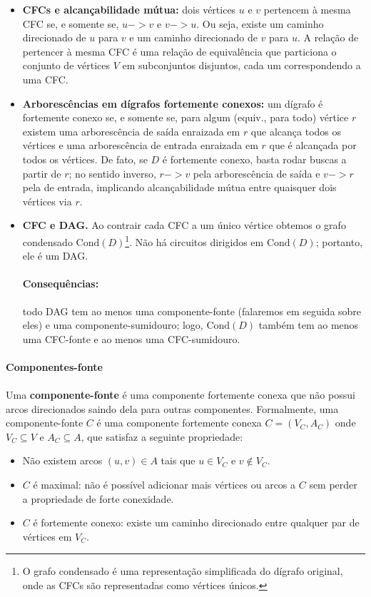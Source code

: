 \documentclass[12pt,a4paper]{article}
\def\emph#1{#1}%
\def\leadsto{->}%
\begin{document}
\begin{itemize}
    \item \textbf{CFCs e alcançabilidade mútua:} dois vértices \(u\) e \(v\) pertencem à mesma CFC se, e somente se, \(u\leadsto v\) e \(v\leadsto u\). Ou seja, existe um caminho direcionado de \(u\) para \(v\) e um caminho direcionado de \(v\) para \(u\). A relação de pertencer à mesma CFC é uma relação de equivalência que particiona o conjunto de vértices \(V\) em subconjuntos disjuntos, cada um correspondendo a uma CFC.
    \item \textbf{Arborescências em dígrafos fortemente conexos:} um dígrafo é fortemente conexo se, e somente se, para algum (equiv., para todo) vértice $r$ existem uma \emph{arborescência de saída} enraizada em $r$ que alcança todos os vértices e uma \emph{arborescência de entrada} enraizada em $r$ que é alcançada por todos os vértices. De fato, se $D$ é fortemente conexo, basta rodar buscas a partir de $r$; no sentido inverso, $r\leadsto v$ pela arborescência de saída e $v\leadsto r$ pela de entrada, implicando alcançabilidade mútua entre quaisquer dois vértices via $r$.
    \item \textbf{CFC e DAG.} Ao \emph{contrair} cada CFC a um único vértice obtemos o grafo condensado $\mathrm{Cond}(D)$\footnote{O grafo condensado é uma representação simplificada do dígrafo original, onde as CFCs são representadas como vértices únicos.}. Não há circuitos dirigidos em $\mathrm{Cond}(D)$; portanto, ele é um DAG.

          \paragraph{Consequências:}
          todo DAG tem ao menos uma componente-fonte (falaremos em seguida sobre eles) e uma componente-sumidouro; logo, $\mathrm{Cond}(D)$ também tem ao menos uma CFC-fonte e ao menos uma CFC-sumidouro.
\end{itemize}

\paragraph{Componentes-fonte}
\paragraph{}Uma \textbf{componente-fonte} é uma componente fortemente conexa que não possui arcos direcionados saindo dela para outras componentes. Formalmente, uma componente-fonte \(C\) é uma componente fortemente conexa \(C = (V_C, A_C)\) onde \(V_C \subseteq V\) e \(A_C \subseteq A\), que satisfaz a seguinte propriedade:
\begin{itemize}
    \item Não existem arcos \((u, v) \in A\) tais que \(u \in V_C\) e \(v \notin V_C\).
    \item \(C\) é maximal: não é possível adicionar mais vértices ou arcos a \(C\) sem perder a propriedade de forte conexidade.
    \item \(C\) é fortemente conexo: existe um caminho direcionado entre qualquer par de vértices em \(V_C\).
\end{itemize}
\end{document}
